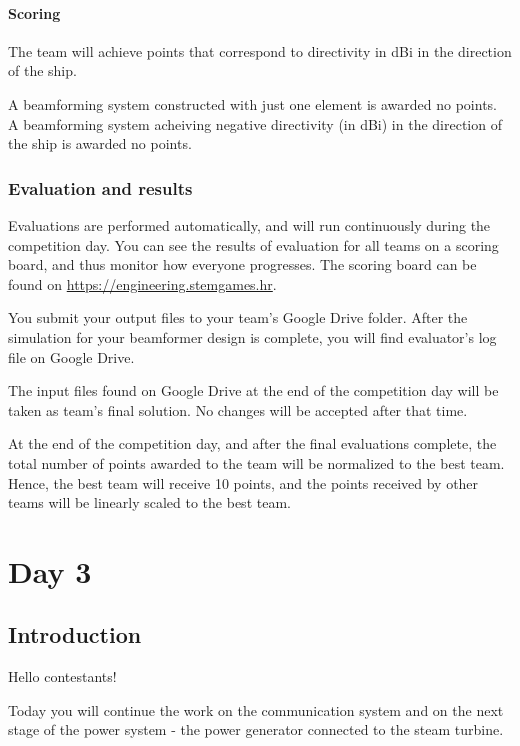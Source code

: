 \documentclass[openany]{book}
\begin{document}
	\subsubsection*{Scoring}
	
	The team will achieve points that correspond to directivity in dBi in the 
	direction of the ship.
	
	A beamforming system constructed with just one element is awarded no 
	points. A 
	beamforming system acheiving negative directivity (in dBi) in the direction 
	of 
	the ship is awarded no points.
	
	\subsection{Evaluation and results}
	
	Evaluations are performed automatically, and will run continuously during 
	the 
	competition day. You can see the results of evaluation for all teams on a 
	scoring board, and thus monitor how everyone progresses. The scoring board 
	can 
	be found on \url{https://engineering.stemgames.hr}.
	
	You submit your output files to your team's Google Drive folder.
	After the simulation for your beamformer design is complete, you will find 
	evaluator's log file on Google Drive.
	
	The input files found on Google Drive at the end of the competition day 
	will be 
	taken as team's final solution. No changes will be accepted after that time.
	
	At the end of the competition day, and after the final evaluations 
	complete, 
	the total number of points awarded to the team will be normalized to the 
	best 
	team. Hence, the best team will receive 10 points, and the points received 
	by 
	other teams will be linearly scaled to the best team.
	
	
	\chapter{Day 3}
	\section{Introduction}
	
	Hello contestants!
	
	Today you will continue the work on the communication system and on the 
	next 
	stage of the power system - the power generator connected to the steam 
	turbine.
	
\end{document}
